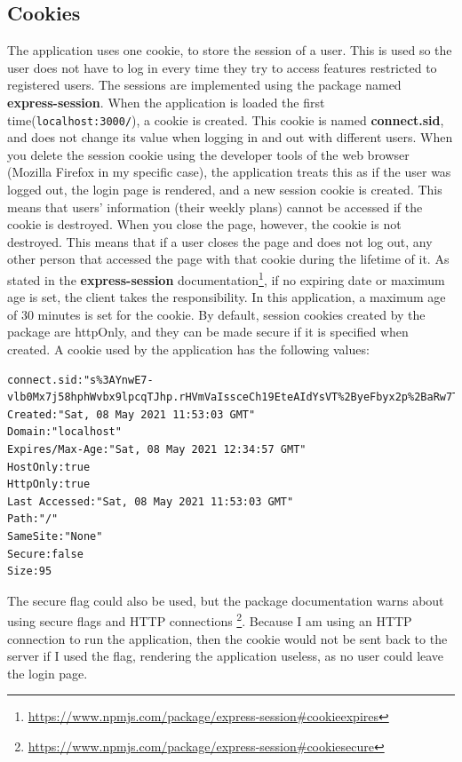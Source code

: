 \documentclass[12pt,twoside,titlepage,a4paper]{article}
\theoremstyle{definicion}
\theoremstyle{lema}
\theoremstyle{teorema}
\theoremstyle{corolario}
\theoremstyle{ejemplo}
\theoremstyle{nota}
\begin{document}
\subsection{Cookies}
The application uses one cookie, to store the session of a user. This is used so the user does not have to log in every time
they try to access features restricted to registered users. The sessions are implemented using the package named 
\textbf{express-session}.
\newline\newline
When the application is loaded the first time(\texttt{localhost:3000/}), a cookie is created. This cookie is named 
\textbf{connect.sid}, and does not change its value when logging in and out with different users. When you delete the session 
cookie using the developer tools of the web browser (Mozilla Firefox in my specific case), the application treats this as if 
the user was logged out, the login page is rendered, and a new session cookie is created. This means that users' information 
(their weekly plans) cannot be accessed if the cookie is destroyed.
\newline\newline
When you close the page, however, the cookie is not destroyed. This means that if a user closes the page and does not log out,
any other person that accessed the page with that cookie during the lifetime of it. As stated in the \textbf{express-session}
documentation\footnote{\url{https://www.npmjs.com/package/express-session\#cookieexpires}}, if no expiring date or maximum age
is set, the client takes the responsibility. In this application, a maximum age of 30 minutes is set for the cookie.
\newline\newline
By default, session cookies created by the package are httpOnly, and they can be made secure if it is specified when created.
A cookie used by the application has the following values:
\begin{lstlisting}
connect.sid:"s%3AYnwE7-vlb0Mx7j58hphWvbx9lpcqTJhp.rHVmVaIssceCh19EteAIdYsVT%2ByeFbyx2p%2BaRw7T1rc"
Created:"Sat, 08 May 2021 11:53:03 GMT"
Domain:"localhost"
Expires/Max-Age:"Sat, 08 May 2021 12:34:57 GMT"
HostOnly:true
HttpOnly:true
Last Accessed:"Sat, 08 May 2021 11:53:03 GMT"
Path:"/"
SameSite:"None"
Secure:false
Size:95
\end{lstlisting}
The secure flag could also be used, but the package documentation warns about using secure flags and HTTP connections
\footnote{\url{https://www.npmjs.com/package/express-session\#cookiesecure}}. Because I am using an HTTP connection to run the
application, then the cookie would not be sent back to the server if I used the flag, rendering the application useless, as no
user could leave the login page.
\end{document}
